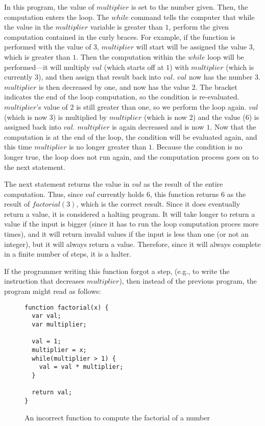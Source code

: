 In this program, the value of $multiplier$ is set to the number given.  Then, the computation enters the loop.  The $while$ command tells the computer that while the value in the $multiplier$ variable is greater than $1$, perform the given computation contained in the curly braces.  For example, if the function is performed with the value of $3$, $multiplier$ will start will be assigned the value $3$, which is greater than $1$.  Then the computation within the $while$ loop will be performed---it will multiply $val$ (which starts off at $1$) with $multiplier$ (which is currently $3$), and then assign that result back into $val$.  $val$ now has the number $3$.  $multiplier$ is then decreased by one, and now has the value $2$.  The bracket indicates the end of the loop computation, so the condition is re-evaluated.  $multiplier$'s value of $2$ is still greater than one, so we perform the loop again.  $val$ (which is now $3$) is multiplied by $multiplier$ (which is now $2$) and the value ($6$) is assigned back into $val$.  $multiplier$ is again decreased and is now $1$.  Now that the computation is at the end of the loop, the condition will be evaluated again, and this time $multiplier$ is no longer greater than $1$.  Because the condition is no longer true, the loop does not run again, and the computation process goes on to the next statement.  

The next statement returns the value in $val$ as the result of the entire computation.  Thus, since $val$ currently holds $6$, this function returns $6$ as the result of $factorial(3)$, which is the correct result.  Since it does eventually return a value, it is considered a halting program.  It will take longer to return a value if the input is bigger (since it has to run the loop computation proces more times), and it will return invalid values if the input is less than one (or not an integer), but it will always return a value.  Therefore, since it will always complete in a finite number of steps, it is a halter.

If the programmer writing this function forgot a step, (e.g., to write the instruction that decreases $multiplier$), then instead of the previous program, the program might read as follows:

\begin{figure}[H]
\begin{mdframed}
\begin{verbatim}
function factorial(x) {
  var val;
  var multiplier;

  val = 1;
  multiplier = x;
  while(multiplier > 1) {
    val = val * multiplier;
  }

  return val;
}
\end{verbatim}
\end{mdframed}
\caption{An incorrect function to compute the factorial of a number}
\end{figure}

